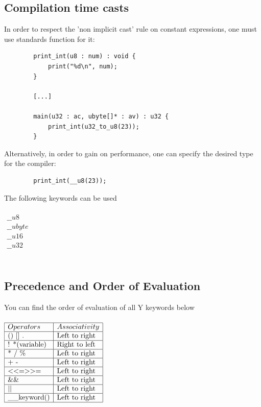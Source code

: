 \documentclass{scrartcl}
\begin{document}
        \subsection{Compilation time casts} \label{comp_cast}
            In order to respect the 'non implicit cast' rule on constant expressions,
            one must use standards function for it:
            \begin{lstlisting}
        print_int(u8 : num) : void {
            print("%d\n", num);
        }

        [...]

        main(u32 : ac, ubyte[]* : av) : u32 {
            print_int(u32_to_u8(23));
        }
            \end{lstlisting}
            Alternatively, in order to gain on performance, one can specify
            the desired type for the compiler:
            \begin{lstlisting}
        print_int(__u8(23));
            \end{lstlisting}
            The following keywords can be used
\\\\
$\begin{array}{l}
\_\_u8\\
\_\_ubyte\\
\_\_u16\\
\_\_u32\\
\end{array}$
\\\\
        \subsection{Precedence and Order of Evaluation}
            You can find the order of evaluation of all Y keywords below
\\\\
$\begin{array}{|l|l|}
\hline
Operators & Associativity\\
\hline
\text{() [] .} & \text{Left to right}\\
\hline
\text{! *(variable)} & \text{Right to left}\\
\hline
\text{* / \%} & \text{Left to right}\\
\hline
\text{+ -} & \text{Left to right}\\
\hline
< <= > >= & \text{Left to right}\\
\hline
\text{\&\&} & \text{Left to right}\\
\hline
|| & \text{Left to right}\\
\hline
\text{\_\_keyword()} & \text{Left to right}\\
\hline
\end{array}$
\end{document}
